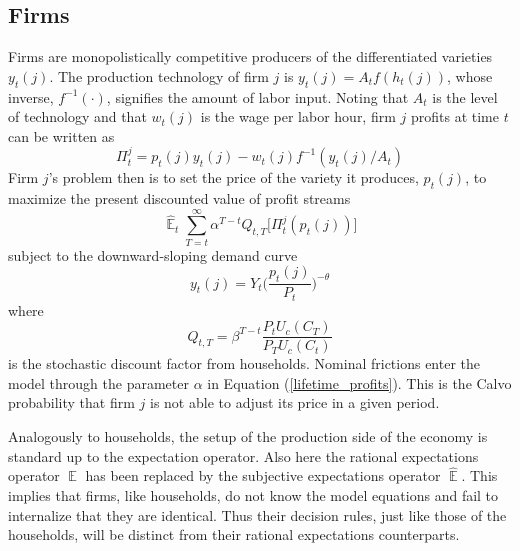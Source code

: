 \documentclass[11pt]{article}
\renewcommand{\[}{\begin{equation}}
\renewcommand{\]}{\end{equation}}
\DeclareMathOperator{\E}{\mathbb{E}}
\begin{document}
\subsection{Firms}

Firms are monopolistically competitive producers of the differentiated varieties $y_t(j)$. The production technology of firm $j$ is $y_t(j)=A_tf(h_t(j))$, whose inverse, $f^{-1}(\cdot)$, signifies the amount of labor input. Noting that $A_t$ is the level of technology and that $w_t(j)$ is the wage per labor hour, firm $j$ profits at time $t$ can be written as
\begin{equation}
\Pi_t^j = p_t(j)y_t(j) -w_t(j)f^{-1}(y_t(j)/A_t)
\end{equation}
Firm $j$'s problem then is to set the price of the variety it produces, $p_t(j)$, to maximize the present discounted value of profit streams
\begin{equation}
\hat{\E}_t\sum^{\infty}_{T=t}\alpha^{T-t} Q_{t,T} \bigg[ \Pi^j_t(p_t(j))\bigg]
\label{lifetime_profits}
\end{equation}
subject to the downward-sloping demand curve
\begin{equation}
y_t(j) = Y_t \bigg(\frac{p_t(j)}{P_t}\bigg)^{-\theta}
\end{equation}
where 
\begin{equation}
Q_{t,T} = \beta^{T-t} \frac{P_t U_c(C_T)}{P_T U_c(C_t)}
\end{equation}
is the stochastic discount factor from households. Nominal frictions enter the model through the parameter $\alpha$ in Equation (\ref{lifetime_profits}). This is the Calvo probability that firm $j$ is not able to adjust its price in a given period. 

Analogously to households, the setup of the production side of the economy is standard up to the expectation operator. Also here the rational expectations operator $\E$ has been replaced by the subjective expectations operator $\hat{\E}$. This implies that firms, like households, do not know the model equations and fail to internalize that they are identical. Thus their decision rules, just like those of the households, will be distinct from their rational expectations counterparts. 
\end{document}
